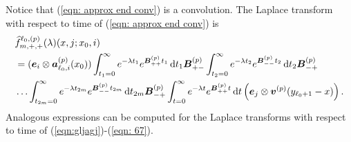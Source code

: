 Notice that (\ref{eqn: approx end conv}) is a convolution. The Laplace transform with respect to time of (\ref{eqn: approx end conv}) is
\begin{align}
	&\widehat f^{\ell_0,(p)}_{m,+,+}(\lambda)(x, j; x_0,i) \nonumber 
	\\&=(\boldsymbol e_i\otimes \boldsymbol  a_{\ell_0,i}^{(p)}(x_0))  \int_{t_1=0}^\infty e^{-\lambda t_1} e^{\boldsymbol{B}^{(p)}_{++}t_1} \, \mathrm{d} t_1 \boldsymbol{B}^{(p)}_{+{-}} \nonumber
	\int_{t_2=0}^\infty e^{-\lambda t_2} e^{\boldsymbol{B}^{(p)}_{--}t_2} \, \mathrm{d} t_2\boldsymbol{B}^{(p)}_{-{+}} 
	\\&\hdots 
	\int_{t_{2m}=0}^\infty e^{-\lambda t_{2m}}e^{\boldsymbol{B}^{(p)}_{--}t_{2m}} \, \mathrm{d} t_{2m}\boldsymbol{B}^{(p)}_{-{+}} 
	\int_{t=0}^\infty e^{-\lambda t}e^{\boldsymbol{B}^{(p)}_{++}t} \, \mathrm{d} t 
	\left(\boldsymbol e_j \otimes {\boldsymbol v}^{(p)}(y_{\ell_0+1}-x)\right). \label{eqn: approx end conv lst}
\end{align}
Analogous expressions can be computed for the Laplace transforms with respect to time of (\ref{eqn:gljagj})-(\ref{eqn: 67}). 


